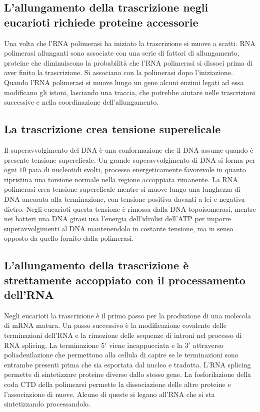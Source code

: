 \subsection{L'allungamento della trascrizione negli eucarioti richiede proteine accessorie}
Una volta che l'RNA polimerasi ha iniziato la trascrizione si muove a scatti. RNA polimerasi allunganti sono associate con una serie di fattori di allungamento, proteine che diminuiscono
la probabilit\`a che l'RNA polimerasi si dissoci prima di aver finito la trascrizione. Si associano con la polimerasi dopo l'iniziazione. Quando l'RNA polimerasi si muove lungo un gene
alcuni enzimi legati ad essa modificano gli istoni, lasciando una traccia, che potrebbe aiutare nelle trascrizioni successive e nella coordinazione dell'allungamento.
\subsection{La trascrizione crea tensione superelicale}
Il superavvolgimento del DNA \`e una conformazione che il DNA assume quando \`e presente tensione superelicale. Un grande superavvolgimento di DNA si forma per ogni $10$ paia di 
nucleotidi svolti, processo energeticamente favorevole in quanto ripristina una torsione normale nella regione accoppiata rimanente. La RNA polimerasi crea tensione superelicale mentre
si muove lungo una lunghezza di DNA ancorata alla terminazione, con tensione positiva davanti a lei e negativa dietro. Negli eucarioti questa tensione \`e rimossa dalla DNA 
topoisomerasi, mentre nei batteri una DNA girasi usa l'energia dell'idrolisi dell'ATP per imporre superavvolgimenti al DNA mantenendolo in costante tensione, ma in senso opposto da 
quello fornito dalla polimerasi. 
\subsection{L'allungamento della trascrizione \`e strettamente accoppiato con il processamento dell'RNA}
Negli eucarioti la trascrizione \`e il primo passo per la produzione di una molecola di mRNA matura. Un passo successivo \`e la modificazione covalente delle terminazioni dell'RNA e 
la rimozione delle sequenze di introni nel processo di RNA splicing. La terminazione $5'$ viene incappucciata e la $3'$ attraverso poliadenilazione che permettono alla cellula di capire
se le terminazioni sono entrambe presenti prima che sia esportata dal nucleo e tradotta. L'RNA splicing permette di sintetizzare proteine diverse dallo stesso gene. La fosforilazione
della coda CTD della polimearsi permette la dissociazione delle altre proteine e l'associazione di nuove. Alcune di queste si legano all'RNA che si sta sintetizzando processandolo. 
